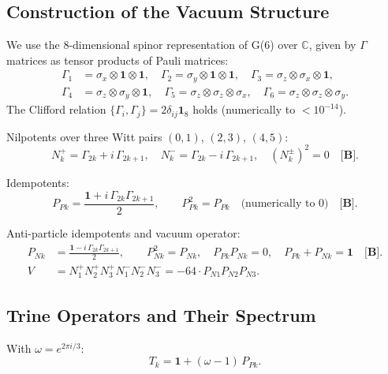 \subsection{Construction of the Vacuum Structure}

We use the 8-dimensional spinor representation of G(6) over $\mathbb{C}$,
given by $\Gamma$ matrices as tensor products of Pauli matrices:
\begin{align}
  \Gamma_1 &= \sigma_x\otimes\mathbf{1}\otimes\mathbf{1}, \quad
  \Gamma_2 = \sigma_y\otimes\mathbf{1}\otimes\mathbf{1}, \quad
  \Gamma_3 = \sigma_z\otimes\sigma_x\otimes\mathbf{1}, \nonumber\\
  \Gamma_4 &= \sigma_z\otimes\sigma_y\otimes\mathbf{1}, \quad
  \Gamma_5 = \sigma_z\otimes\sigma_z\otimes\sigma_x, \quad
  \Gamma_6 = \sigma_z\otimes\sigma_z\otimes\sigma_y.
\end{align}
The Clifford relation $\{\Gamma_i, \Gamma_j\} = 2\delta_{ij}\mathbf{1}_8$
holds (numerically to $< 10^{-14}$).

Nilpotents over three Witt pairs $(0,1)$, $(2,3)$, $(4,5)$:
\begin{equation}
  N_k^+ = \Gamma_{2k} + i\,\Gamma_{2k+1}, \quad
  N_k^- = \Gamma_{2k} - i\,\Gamma_{2k+1}, \quad
  (N_k^\pm)^2 = 0 \quad \textbf{[B]}.
\end{equation}

Idempotents:
\begin{equation}
  P_{Pk} = \frac{\mathbf{1} + i\,\Gamma_{2k}\Gamma_{2k+1}}{2},
  \qquad P_{Pk}^2 = P_{Pk} \quad \text{(numerically to } 0\text{)} \quad \textbf{[B]}.
\end{equation}

Anti-particle idempotents and vacuum operator:
\begin{align}
  P_{Nk} &= \frac{\mathbf{1} - i\,\Gamma_{2k}\Gamma_{2k+1}}{2},
  \qquad P_{Nk}^2 = P_{Nk},\quad P_{Pk}P_{Nk} = 0,\quad P_{Pk}+P_{Nk} = \mathbf{1} \quad \textbf{[B]}. \\
  V &= N_1^+N_2^+N_3^+N_1^-N_2^-N_3^- = -64\cdot P_{N1}P_{N2}P_{N3}.
  \label{eq:V_def}
\end{align}

\subsection{Trine Operators and Their Spectrum}

With $\omega = e^{2\pi i/3}$:
\begin{equation}
  T_k = \mathbf{1} + (\omega - 1)\,P_{Pk}.
  \label{eq:trine_def}
\end{equation}


